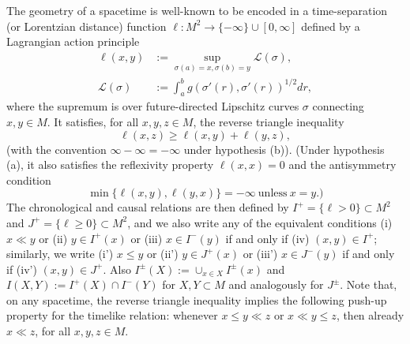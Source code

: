 \documentclass[12pt]{amsart}
\newcommand{\LL}{\mathcal{L}}
\begin{document}
The geometry of a spacetime is well-known to be encoded in a time-separation (or Lorentzian distance) function $\ell:M^2 \longrightarrow \{-\infty\} \cup [0,\infty]$ defined by
a Lagrangian action principle
\begin{align}
\label{global time separation}
\ell(x,y) &:= \sup_{\sigma(a) = x, \sigma(b)=y} \LL(\sigma),
\\ \LL(\sigma) &:= \int_a^b g(\sigma'(r),\sigma'(r))^{1/2} dr,
\label{action}
\end{align}
where the supremum is over future-directed Lipschitz curves $\sigma$ connecting $x,y \in M$.
It satisfies,
for all $x,y,z \in M$, the reverse triangle inequality
\begin{equation}\label{rti}
\ell(x,z) \ge \ell(x,y) + \ell(y,z),
\end{equation}
{(with the convention $\infty-\infty=-\infty$ under hypothesis (b)).}
(Under hypothesis (a), it also satisfies the reflexivity property $\ell(x,x)=0$ and the antisymmetry condition
$$
\min\{\ell(x,y),\ell(y,x)\} =-\infty\ \mbox{unless}\ x=y.)
$$
The chronological and causal relations are then defined by $I^+= \{ \ell >0\} \subset M^2$ and $J^+=\{ \ell \ge 0\} \subset M^2$, 
and we also write any of the equivalent conditions (i) $x \ll y$ or (ii) $y \in I^+(x)$ or (iii) $x \in I^-(y)$ if and only if (iv) $(x,y) \in I^+$;  similarly, we write (i') $x \le y$ or (ii') $y \in J^+(x)$ or (iii') $x \in J^-(y)$ if and only if (iv') $(x,y) \in J^+$. Also $I^\pm(X) := \cup_{x \in X} I^\pm(x)$ and $I(X,Y) :=I^+(X)\cap I^-(Y)$ for $X,Y \subset M$ and analogously for $J^\pm$. Note that, on any spacetime, the reverse triangle inequality implies the following push-up property for the timelike relation: whenever $x \leq y \ll z$ or $x \ll y \leq z$, then already $x \ll z$, for all $x,y,z \in M$.
\end{document}
